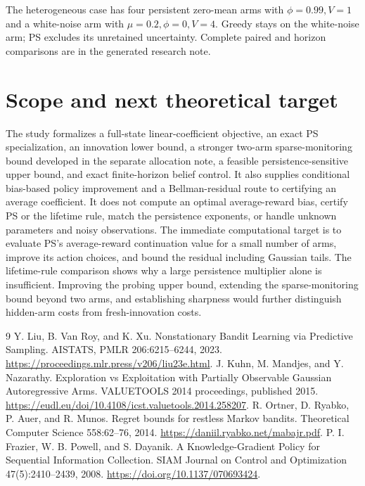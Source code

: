 \documentclass[11pt]{article}
\begin{document}
The heterogeneous case has four persistent zero-mean arms with $\phi=0.99,V=1$ and a white-noise arm with $\mu=0.2,\phi=0,V=4$. Greedy stays on the white-noise arm; PS excludes its unretained uncertainty. Complete paired and horizon comparisons are in the generated research note.

\clearpage

\section{Scope and next theoretical target}
The study formalizes a full-state linear-coefficient objective, an exact PS specialization, an innovation lower bound, a stronger two-arm sparse-monitoring bound developed in the separate allocation note, a feasible persistence-sensitive upper bound, and exact finite-horizon belief control. It also supplies conditional bias-based policy improvement and a Bellman-residual route to certifying an average coefficient. It does not compute an optimal average-reward bias, certify PS or the lifetime rule, match the persistence exponents, or handle unknown parameters and noisy observations. The immediate computational target is to evaluate PS's average-reward continuation value for a small number of arms, improve its action choices, and bound the residual including Gaussian tails. The lifetime-rule comparison shows why a large persistence multiplier alone is insufficient. Improving the probing upper bound, extending the sparse-monitoring bound beyond two arms, and establishing sharpness would further distinguish hidden-arm costs from fresh-innovation costs.

\begin{thebibliography}{9}
 Y. Liu, B. Van Roy, and K. Xu. Nonstationary Bandit Learning via Predictive Sampling. AISTATS, PMLR 206:6215--6244, 2023. \url{https://proceedings.mlr.press/v206/liu23e.html}.
 J. Kuhn, M. Mandjes, and Y. Nazarathy. Exploration vs Exploitation with Partially Observable Gaussian Autoregressive Arms. VALUETOOLS 2014 proceedings, published 2015. \url{https://eudl.eu/doi/10.4108/icst.valuetools.2014.258207}.
 R. Ortner, D. Ryabko, P. Auer, and R. Munos. Regret bounds for restless Markov bandits. Theoretical Computer Science 558:62--76, 2014. \url{https://daniil.ryabko.net/mabajr.pdf}.
 P. I. Frazier, W. B. Powell, and S. Dayanik. A Knowledge-Gradient Policy for Sequential Information Collection. SIAM Journal on Control and Optimization 47(5):2410--2439, 2008. \url{https://doi.org/10.1137/070693424}.
\end{thebibliography}
\end{document}
